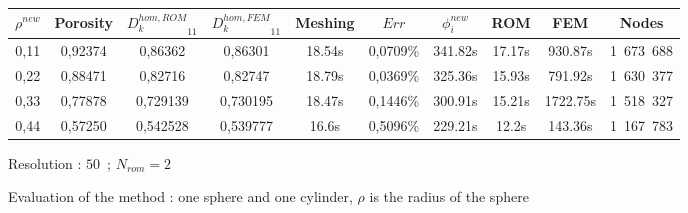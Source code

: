 {\begin{figure}[H]%
%
\begin{center}
\begin{tabular}{|c|c||c|c||c|c||c|c||c||c|}
\hline
\rowcolor{lightgray} $\rho^{new}$&Porosity&${D_k^{hom,ROM}}_{11}$&${D_k^{hom,FEM}}_{11}$&Meshing&$Err$&$\phi_i^{new}$&ROM&FEM&Nodes\\
\hline
0,11&0,92374&0,86362&0,86301&18.54s&0,0709\%&341.82s&17.17s&930.87s&1\ 673\ 688\\
\hline
0,22&0,88471&0,82716&0,82747&18.79s&0,0369\%&325.36s&15.93s&791.92s&1\ 630\ 377\\
\hline
0,33&0,77878&0,729139&0,730195&18.47s&0,1446\%&300.91s&15.21s&1722.75s&1\ 518\ 327\\
\hline
0,44&0,57250&0,542528&0,539777&16.6s&0,5096\%&229.21s&12.2s&143.36s&1\ 167\ 783\\
\hline
\end{tabular}
\end{center}
\caption{Resolution : $50$\ ; $N_{rom}=2$}
%
\end{figure}

\ligneinter

\begin{figure}[H]%
%
\begin{table}[H]
\begin{center}
%
%
\qquad
{}%
%
\end{center}
\end{table}
%
\caption{Evaluation of the method : one sphere and one cylinder, $\rho$ is the radius of the sphere}
\end{figure}

}
